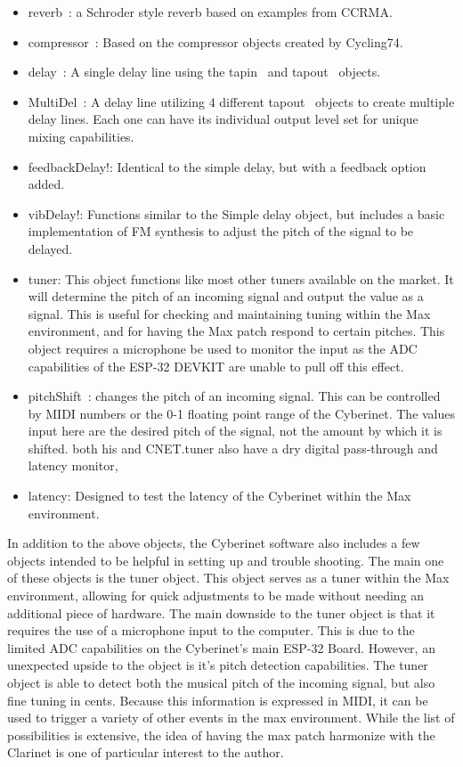 \begin{itemize}
    \item reverb~: a Schroder style reverb based on examples from CCRMA.
    \item compressor~: Based on the compressor objects created by Cycling74.
    \item delay~: A single delay line using the tapin~ and tapout~ objects. 
    \item MultiDel~: A delay line utilizing 4 different tapout~ objects to create multiple delay lines. Each one can have its individual output level set for unique mixing capabilities.
    \item feedbackDelay!: Identical to the simple delay, but with a feedback option added.
    \item vibDelay!: Functions similar to the Simple delay object, but includes a basic implementation of FM synthesis to adjust the pitch of the signal to be delayed. 
    \item tuner: This object functions like most other tuners available on the market. It will determine the pitch of an incoming signal and output the value as a signal. This is useful for checking and maintaining tuning within the Max environment, and for having the Max patch respond to certain pitches. This object requires a microphone be used to monitor the input as the ADC capabilities of the ESP-32 DEVKIT are unable to pull off this effect.
    \item pitchShift~: changes the pitch of an incoming signal. This can be controlled by MIDI  numbers or the 0-1 floating point range of the Cyberinet. The values input here are the desired pitch of the signal, not the amount by which it is shifted. both his and CNET.tuner also have a dry digital pass-through and latency monitor,
    \item latency: Designed to test the latency of the Cyberinet within  the Max environment.
\end{itemize}


In addition to the above objects, the Cyberinet software also includes a few objects intended to be helpful in setting up and trouble shooting. The main one of these objects is the tuner object. This object serves as a tuner within the Max environment, allowing for quick adjustments to be made without needing an additional piece of hardware. 
The main downside to the tuner object is that it requires the use of a microphone input to the computer. This is due to the limited ADC capabilities on the Cyberinet's main ESP-32 Board. However, an unexpected upside to the object is it's pitch detection capabilities. The tuner object is able to detect both the musical pitch of the incoming signal, but also fine tuning in cents. Because this information is expressed in MIDI, it can be used to trigger a variety of other events in the max environment. While the list of possibilities is extensive, the idea of having the max patch harmonize with the Clarinet is one of particular interest to the author.

